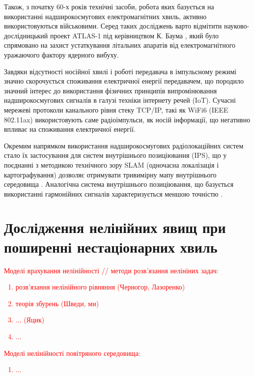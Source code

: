 Також, з початку 60-х років технічні засоби, робота яких базується на 
використанні надширокосмугових електромагнітних хвиль, активно 
використовуються військовими. Серед таких досліджень варто відмітити 
науково-дослідницький проект ATLAS-1 під керівництвом К. Баума 
\cite{imp:BaumSSN0267}, який було спрямовано на захист устаткування 
літальних апаратів від електромагнітного уражаючого фактору ядерного 
вибуху.

Завдяки відсутності носійної хвилі і роботі передавача в імпульсному режимі 
значно скорочується споживання електричної енергії передавачем, що породило 
значний інтерес до використання фізичних принципів випромінювання 
надширокосмугових сигналів в галузі техніки інтернету речей (IoT). 
Сучасні мережеві протоколи канального рівня стеку TCP/IP, такі як WiFi6 
(IEEE 802.11ax) \cite{imp:Khorov2019} використовують саме радіоімпульси,
як носій інформації, що негативно впливає на споживання електричної енергії.

Окремим напрямком використання надширокосмугових радіолокаційних систем 
стало їх застосування для систем внутрішнього позиціювання (IPS), що у 
поєднанні з методикою технічного зору SLAM (одночасна локалізація і 
картографування) дозволяє отримувати тривимірну мапу внутрішнього 
середовища \cite{imp:Segura2011}. Аналогічна система внутрішнього 
позиціювання, що базується використанні гармонійних сигналів 
характеризується меншою точністю \cite{imp:Zou2017}.

\section{Дослідження нелінійних явищ при поширенні нестаціонарних хвиль}

\textcolor{red}{ Моделі врахування нелінійності // методи розв'язання 
нелініних задач:
%
\begin{enumerate}
\item розв'язання нелінійного рівняння (Черногор, Лазоренко)
\item теорія збурень (Шведи, ми)
\item ... (Яцик)
\item ...
\end{enumerate}
%
Моделі нелінійності повітряного середовища:
%
\begin{enumerate}
\item ...
\end{enumerate}
%
}

